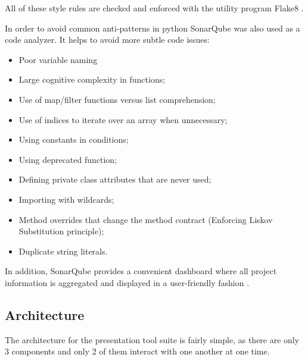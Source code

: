 \documentclass[12pt, fleqn, a4paper]{article}
\begin{document}
All of these style rules are checked and enforced with the utility program Flake8 \citep{flake8}.\par
In order to avoid common anti-patterns in python SonarQube was also used as a code analyzer. It helps to avoid more subtle code issues:
\begin{itemize}
	\item Poor variable naming
	\item Large cognitive complexity in functions;
	\item Use of map/filter functions versus list comprehension;
	\item Use of indices to iterate over an array when unnecessary;
	\item Using constants in conditions;
	\item Using deprecated function;
	\item Defining private class attributes that are never used;
	\item Importing with wildcards;
	\item Method overrides that change the method contract (Enforcing Liskov Substitution principle);
	\item Duplicate string literals.
\end{itemize}
In addition, SonarQube provides a convenient dashboard where all project information is aggregated and displayed in a user-friendly fashion \citep{sonarqube}.
\subsection{Architecture}
The architecture for the presentation tool suite is fairly simple, as there are only 3 components and only 2 of them interact with one another at one time.
\end{document}
